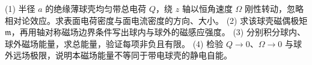 (1) 半径 \(a\) 的绝缘薄球壳均匀带总电荷 \(Q\)，绕 \(z\) 轴以恒角速度 \(\Omega\) 刚性转动，忽略相对论效应。求表面电荷密度与面电流密度的方向、大小。
(2) 求该球壳磁偶极矩 \(\boldsymbol{\mathfrak m}\)，再用轴对称磁场边界条件写出球内与球外的磁感应强度。
(3) 分别积分球内、球外磁场能量，求总能量，验证每项非负且有限。
(4) 检验 \(Q\to0\)、\(\Omega\to0\) 与球外远场极限，说明本磁场能量不等同于带电球壳的静电自能。
